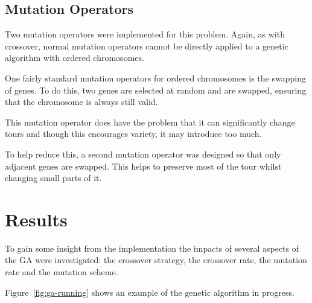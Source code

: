 \documentclass[10pt, a4paper]{article}
\begin{document}
\subsection{Mutation Operators}

Two mutation operators were implemented for this problem. Again, as with
crossover, normal mutation operators cannot be directly applied to a genetic
algorithm with ordered chromosomes.

One fairly standard mutation operators for ordered chromosomes is the swapping
of genes. To do this, two genes are selected at random and are swapped, ensuring
that the chromosome is always still valid.

This mutation operator does have the problem that it can significantly change
tours and though this encourages variety, it may introduce too much.

To help reduce this, a second mutation operator was designed so that only
adjacent genes are swapped. This helps to preserve most of the tour whilst
changing small parts of it.
 
\newpage
\section{Results}
\label{sec:results}

To gain some insight from the implementation the impacts of several aspects of
the GA were investigated: the crossover strategy, the crossover rate, the
mutation rate and the mutation scheme.

Figure~\ref{fig:ga-running} shows an example of the genetic algorithm in
progress.
\end{document}
